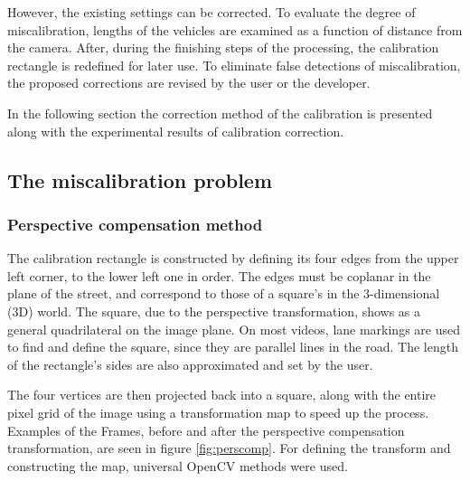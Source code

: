 However, the existing settings can be corrected.
To evaluate the degree of miscalibration, lengths of the vehicles are examined as a function of distance from the camera.
After, during the finishing steps of the processing, the calibration rectangle is redefined for later use.
To eliminate false detections of miscalibration, the proposed corrections are revised by the user or the developer.

In the following section the correction method of the calibration is presented along with the experimental results of calibration correction.

\subsection{The miscalibration problem}
\subsubsection{Perspective compensation method}
The calibration rectangle is constructed by defining its four edges from the upper left corner, to the lower left one in order.
The edges must be coplanar in the plane of the street, and correspond to those of a square's in the 3-dimensional (3D) world.
The square, due to the perspective transformation, shows as a general quadrilateral on the image plane.
On most videos, lane markings are used to find and define the square, since they are parallel lines in the road.
The length of the rectangle's sides are also approximated and set by the user.

The four vertices are then projected back into a square, along with the entire pixel grid of the image using a transformation map to speed up the process.
Examples of the Frames, before and after the perspective compensation transformation, are seen in figure \ref{fig:perscomp}.
For defining the transform and constructing the map, universal OpenCV methods were used\cite{PersTrans, WrapPers}.

